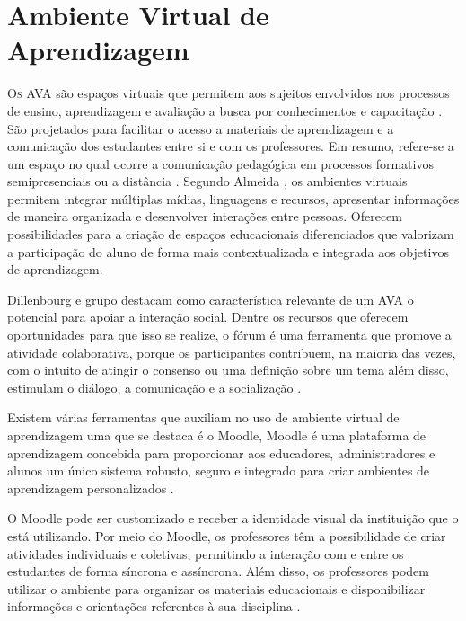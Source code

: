 \section{Ambiente Virtual de Aprendizagem}
\lettrine{O}{s} AVA são espaços virtuais que permitem aos sujeitos envolvidos nos processos de ensino, aprendizagem e avaliação a busca por conhecimentos e capacitação \cite{maciel2012ambientes}. São projetados para facilitar o acesso a materiais de aprendizagem e a comunicação dos estudantes entre si e com os professores. Em resumo, refere-se a um espaço no qual ocorre a comunicação pedagógica em processos formativos semipresenciais ou a distância \cite{adell2010ambientes}. Segundo Almeida \cite{almeida2011educaccao}, os ambientes virtuais permitem integrar múltiplas mídias, linguagens e recursos, apresentar informações de maneira organizada e desenvolver interações entre pessoas. Oferecem possibilidades para a criação de espaços educacionais diferenciados que valorizam a participação do aluno de forma mais contextualizada e integrada aos objetivos de aprendizagem. 

Dillenbourg e grupo \cite{dillenbourg2002virtual} destacam como característica relevante de um AVA o potencial para apoiar a interação social. Dentre os recursos que oferecem oportunidades para que isso se realize, o fórum é uma ferramenta que promove a atividade colaborativa, porque os participantes contribuem, na maioria das vezes, com o intuito de atingir o consenso ou uma definição sobre um tema \cite{de2012aprendizagem} além disso, estimulam o diálogo, a comunicação e a socialização \cite{oesterreich2010potencialidades}.

Existem várias ferramentas que auxiliam no uso de ambiente virtual de aprendizagem uma que se destaca é o Moodle, Moodle é uma plataforma de aprendizagem concebida para proporcionar aos educadores, administradores e alunos um único sistema robusto, seguro e integrado para criar ambientes de aprendizagem personalizados \cite{Moodle}.

O Moodle pode ser customizado e receber a identidade visual da instituição que o está utilizando. Por meio do Moodle, os professores têm a possibilidade de criar atividades individuais e coletivas, permitindo a interação com e entre os estudantes de forma síncrona e assíncrona. Além disso, os professores podem utilizar o ambiente para organizar os materiais educacionais e disponibilizar informações e orientações referentes à sua disciplina \cite{carvalho2008lms}.

